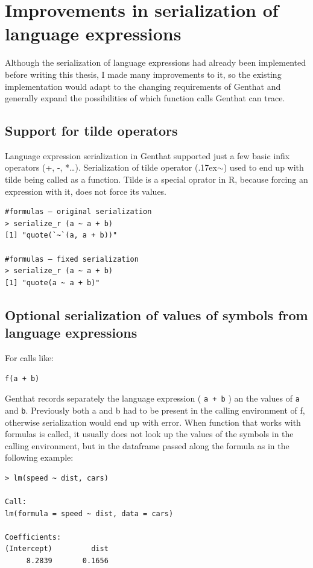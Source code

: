 \documentclass[thesis=B,english]{FITthesis}[2012/10/20]
\begin{document}
\section{Improvements in serialization of language expressions}
Although the serialization of language expressions had already been implemented before writing this thesis, I made many improvements to it, so the existing implementation would adapt to the changing requirements of Genthat and generally expand the possibilities of which function calls Genthat can trace.

\subsection{Support for tilde operators}
Language expression serialization in Genthat supported just a few basic infix operators (+, -, *…). Serialization of tilde operator ({\raise.17ex\hbox{$\scriptstyle\sim$}}) used to end up with tilde being called as a function. Tilde is a special oprator in R, because forcing an expression with it, does not force its values.

\begin{verbatim}
#formulas – original serialization
> serialize_r (a ~ a + b)
[1] "quote(`~`(a, a + b))"

#formulas – fixed serialization
> serialize_r (a ~ a + b)
[1] "quote(a ~ a + b)"
\end{verbatim}
    
\subsection{Optional serialization of values of symbols from language expressions}
For calls like:
\begin{verbatim}
f(a + b)
\end{verbatim}

Genthat records separately the language expression ( \verb|a + b| ) an the values of \verb|a| and \verb|b|. Previously both a and b had to be present in the calling environment of f, otherwise serialization would end up with error. When function that works with formulas is called, it usually does not look up the values of the symbols in the calling environment, but in the dataframe passed along the formula as in the following example:

\begin{verbatim}
> lm(speed ~ dist, cars)

Call:
lm(formula = speed ~ dist, data = cars)

Coefficients:
(Intercept)         dist
     8.2839       0.1656
\end{verbatim}
\end{document}
